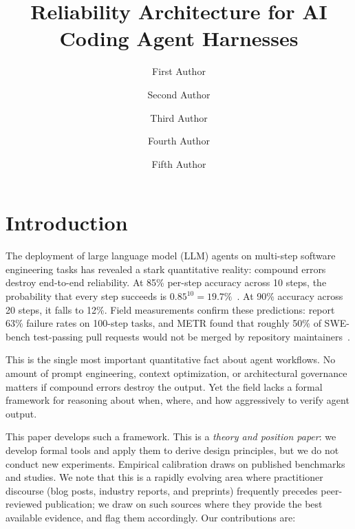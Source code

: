\documentclass[11pt, a4paper, copyright]{googledeepmind}
\title{Reliability Architecture for AI Coding Agent Harnesses}
\author[1]{First Author}
\author[2]{Second Author}
\author[2]{Third Author}
\author[1]{Fourth Author}
\author[1]{Fifth Author}
\affil[*]{Equal Contribution}
\affil[1]{Affiliation 1}
\affil[2]{Affiliation 2}
\begin{document}
\maketitle

\section{Introduction}
\label{sec:intro}

The deployment of large language model (LLM) agents on multi-step software engineering tasks has revealed a stark quantitative reality: compound errors destroy end-to-end reliability.
At 85\% per-step accuracy across 10 steps, the probability that every step succeeds is $0.85^{10} = 19.7\%$~\citep{rajan2026math}.
At 90\% accuracy across 20 steps, it falls to 12\%.
Field measurements confirm these predictions: \citet{hariharan2025plan} report 63\% failure rates on 100-step tasks, and METR found that roughly 50\% of SWE-bench test-passing pull requests would not be merged by repository maintainers~\citep{metr2026swebench}.

This is the single most important quantitative fact about agent workflows.
No amount of prompt engineering, context optimization, or architectural governance matters if compound errors destroy the output.
Yet the field lacks a formal framework for reasoning about when, where, and how aggressively to verify agent output.

This paper develops such a framework. This is a \emph{theory and position paper}: we develop formal tools and apply them to derive design principles, but we do not conduct new experiments. Empirical calibration draws on published benchmarks and studies. We note that this is a rapidly evolving area where practitioner discourse (blog posts, industry reports, and preprints) frequently precedes peer-reviewed publication; we draw on such sources where they provide the best available evidence, and flag them accordingly. Our contributions are:
\end{document}
